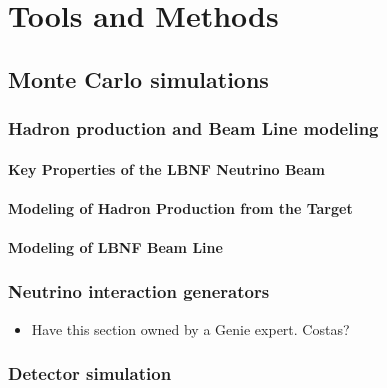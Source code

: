 \chapter{Tools and Methods}
\label{ch:tools}


\section{Monte Carlo simulations}
\label{sec:tools-mc}

\subsection{Hadron production and Beam Line modeling}
\label{sec:tools-mc-had-beam}

\subsubsection{Key Properties of the LBNF Neutrino Beam}
\label{ss:tools-beam-properties}

\subsubsection{Modeling of Hadron Production from the Target}
\label{ss:tools-hadron-production-modeling}

\subsubsection{Modeling of LBNF Beam Line}
\label{ss:tools-beam-line-modeling}

\subsection{Neutrino interaction generators} 
\label{sec:tools-mc-gen}

\begin{itemize}
\item Have this section owned by a Genie expert. Costas?
\end{itemize}


\subsection{Detector simulation}
\label{sec:tools-mc-detsim}

